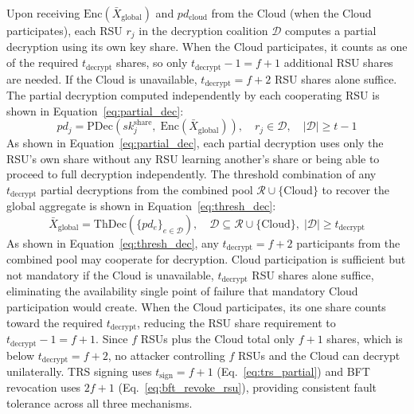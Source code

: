\documentclass[12pt, a4paper]{report}
\begin{document}
Upon receiving $\mathrm{Enc}(\bar{X}_{\mathrm{global}})$ and
$pd_{\mathrm{cloud}}$ from the Cloud (when the Cloud participates),
each RSU $r_j$ in the decryption coalition $\mathcal{D}$ computes
a partial decryption using its own key share. When the Cloud
participates, it counts as one of the required
$t_{\mathrm{decrypt}}$ shares, so only $t_{\mathrm{decrypt}}-1 =
f+1$ additional RSU shares are needed. If the Cloud is
unavailable, $t_{\mathrm{decrypt}} = f+2$ RSU shares alone
suffice. The partial decryption
computed independently by each cooperating RSU is shown in
Equation~\eqref{eq:partial_dec}:
\begin{equation}
  pd_j = \mathrm{PDec}\!\left(sk_j^{\mathrm{share}},\;
    \mathrm{Enc}(\bar{X}_{\mathrm{global}})\right),
  \quad r_j \in \mathcal{D},\quad |\mathcal{D}| \geq t-1
  \label{eq:partial_dec}
\end{equation}
As shown in Equation~\eqref{eq:partial_dec}, each partial decryption
uses only the RSU's own share without any RSU learning another's share
or being able to proceed to full decryption independently. The threshold combination of any $t_{\mathrm{decrypt}}$ partial
decryptions from the combined pool
$\mathcal{R} \cup \{\mathrm{Cloud}\}$ to recover the global
aggregate is shown in Equation~\eqref{eq:thresh_dec}:
\begin{equation}
  \bar{X}_{\mathrm{global}} =
    \mathrm{ThDec}\!\left(\{pd_e\}_{e \in \mathcal{D}}\right),
    \quad \mathcal{D} \subseteq
    \mathcal{R} \cup \{\mathrm{Cloud}\},\;
    |\mathcal{D}| \geq t_{\mathrm{decrypt}}
  \label{eq:thresh_dec}
\end{equation}
As shown in Equation~\eqref{eq:thresh_dec}, any
$t_{\mathrm{decrypt}} = f+2$ participants from the combined pool
may cooperate for decryption. Cloud participation is sufficient
but not mandatory if the Cloud is unavailable, $t_{\mathrm{decrypt}}$
RSU shares alone suffice, eliminating the availability single
point of failure that mandatory Cloud participation would create.
When the Cloud participates, its one share counts toward the
required $t_{\mathrm{decrypt}}$, reducing the RSU share
requirement to $t_{\mathrm{decrypt}} - 1 = f+1$.
Since $f$ RSUs plus the Cloud total only $f+1$ shares, which is
below $t_{\mathrm{decrypt}} = f+2$, no attacker controlling $f$
RSUs and the Cloud can decrypt unilaterally.
TRS signing uses $t_{\mathrm{sign}} = f+1$
(Eq.~\eqref{eq:trs_partial}) and BFT revocation uses $2f+1$
(Eq.~\eqref{eq:bft_revoke_rsu}), providing consistent fault
tolerance across all three mechanisms.
\end{document}
